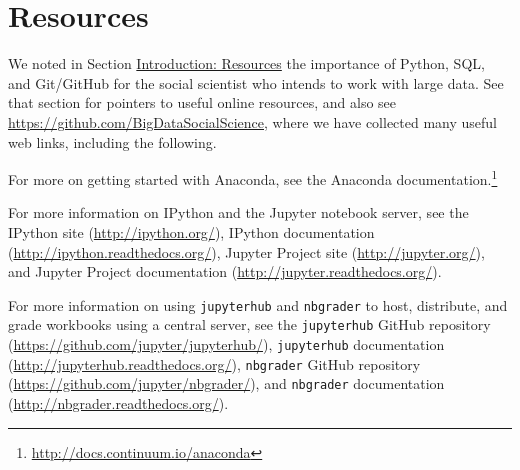\documentclass[]{krantz}
\begin{document}
\section{Resources}\label{resources-7}

We noted in Section \protect\hyperlink{chap:intro}{Introduction:
Resources} the importance of Python, SQL, and Git/GitHub for the social
scientist who intends to work with large data. See that section for
pointers to useful online resources, and also see
\url{https://github.com/BigDataSocialScience}, where we have collected
many useful web links, including the following.

For more on getting started with Anaconda, see the Anaconda
documentation.\footnote{\url{http://docs.continuum.io/anaconda}}

For more information on IPython and the Jupyter notebook server, see the
IPython site (\url{http://ipython.org/}), IPython documentation
(\url{http://ipython.readthedocs.org/}), Jupyter Project site
(\url{http://jupyter.org/}), and Jupyter Project documentation
(\url{http://jupyter.readthedocs.org/}).

For more information on using \texttt{jupyterhub} and \texttt{nbgrader}
to host, distribute, and grade workbooks using a central server, see the
\texttt{jupyterhub} GitHub repository
(\url{https://github.com/jupyter/jupyterhub/}), \texttt{jupyterhub}
documentation (\url{http://jupyterhub.readthedocs.org/}),
\texttt{nbgrader} GitHub repository
(\url{https://github.com/jupyter/nbgrader/}), and \texttt{nbgrader}
documentation (\url{http://nbgrader.readthedocs.org/}).


\end{document}
